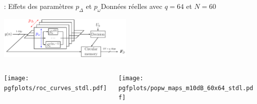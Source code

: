 \documentclass[../main.tex]{subfiles}
\begin{document}
\begin{frame}{\subsecname : {Effets des paramètres $p_\Delta$ et $p_\omega$}}{Données réelles avec $q = 64$ et $N = 60$}
  \begin{overlayarea}{\linewidth}{.15\textheight} \vspace {-1.2cm}
    \hfill \includegraphics[width=6.5cm, height=.75\textheight, keepaspectratio=true]{figures/tikzpicture/funct_view_detection_stdl.pdf}
  \end{overlayarea}
  \begin{columns}
    \begin{column}{.65\linewidth}
      \begin{overlayarea}{\linewidth}{.75\textheight} \vspace {-.5cm}
        \texttt{[image: pgfplots/roc\_curves\_stdl.pdf]}
      \end{overlayarea}
    \end{column}
    \begin{column}{.35\linewidth} \vspace {-.5cm}
      \texttt{[image: pgfplots/popw\_maps\_m10dB\_60x64\_stdl.pdf]}
    \end{column}
  \end{columns}
\end{frame}




\end{document}
